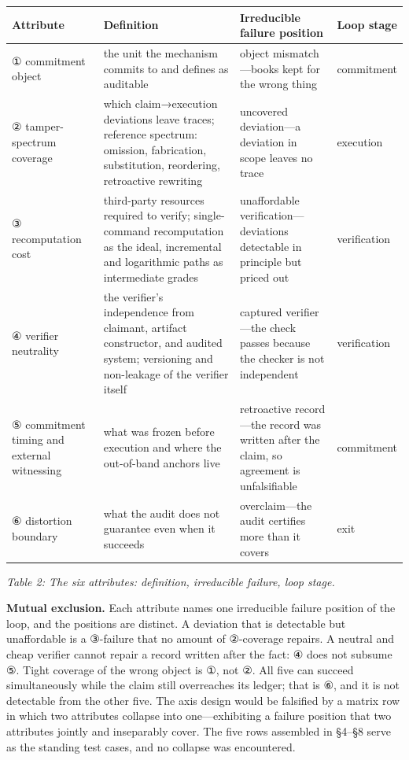 \documentclass[11pt]{article}
\begin{document}
\noindent\begin{tabularx}{\textwidth}{@{}p{} >{\raggedright\arraybackslash}X >{\raggedright\arraybackslash}X p{}@{}}
\toprule
\textbf{\textbf{Attribute}} & \textbf{\textbf{Definition}} & \textbf{\textbf{Irreducible failure position}} & \textbf{\textbf{Loop stage}} \\
\midrule
① commitment object & the unit the mechanism commits to and defines as auditable & object mismatch—books kept for the wrong thing & commitment \\
② tamper-spectrum coverage & which claim→execution deviations leave traces; reference spectrum: omission, fabrication, substitution, reordering, retroactive rewriting & uncovered deviation—a deviation in scope leaves no trace & execution \\
③ recomputation cost & third-party resources required to verify; single-command recomputation as the ideal, incremental and logarithmic paths as intermediate grades & unaffordable verification—deviations detectable in principle but priced out & verification \\
④ verifier neutrality & the verifier's independence from claimant, artifact constructor, and audited system; versioning and non-leakage of the verifier itself & captured verifier—the check passes because the checker is not independent & verification \\
⑤ commitment timing and external witnessing & what was frozen before execution and where the out-of-band anchors live & retroactive record—the record was written after the claim, so agreement is unfalsifiable & commitment \\
⑥ distortion boundary & what the audit does not guarantee even when it succeeds & overclaim—the audit certifies more than it covers & exit \\
\bottomrule
\end{tabularx}
\endgroup
\begin{center}\emph{Table 2: The six attributes: definition, irreducible failure, loop stage.}\end{center}
\noindent \textbf{Mutual exclusion.} Each attribute names one irreducible failure position of the loop, and the positions are distinct. A deviation that is detectable but unaffordable is a ③-failure that no amount of ②-coverage repairs. A neutral and cheap verifier cannot repair a record written after the fact: ④ does not subsume ⑤. Tight coverage of the wrong object is ①, not ②. All five can succeed simultaneously while the claim still overreaches its ledger; that is ⑥, and it is not detectable from the other five. The axis design would be falsified by a matrix row in which two attributes collapse into one—exhibiting a failure position that two attributes jointly and inseparably cover. The five rows assembled in §4–§8 serve as the standing test cases, and no collapse was encountered.\par
\end{document}
